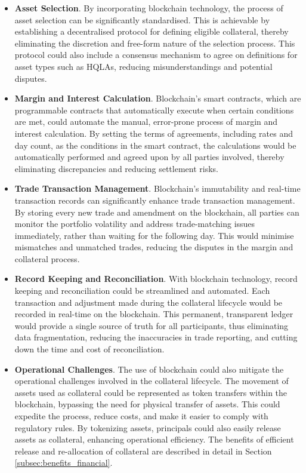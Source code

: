 \begin{itemize}
    \item \textbf{Asset Selection}. By incorporating blockchain technology, the process of asset selection can be significantly standardised. This is achievable by establishing a decentralised protocol for defining eligible collateral, thereby eliminating the discretion and free-form nature of the selection process. This protocol could also include a consensus mechanism to agree on definitions for asset types such as HQLAs, reducing misunderstandings and potential disputes.

    \item \textbf{Margin and Interest Calculation}. Blockchain's smart contracts, which are programmable contracts that automatically execute when certain conditions are met, could automate the manual, error-prone process of margin and interest calculation. By setting the terms of agreements, including rates and day count, as the conditions in the smart contract, the calculations would be automatically performed and agreed upon by all parties involved, thereby eliminating discrepancies and reducing settlement risks.
    
    \item \textbf{Trade Transaction Management}. Blockchain's immutability and real-time transaction records can significantly enhance trade transaction management. By storing every new trade and amendment on the blockchain, all parties can monitor the portfolio volatility and address trade-matching issues immediately, rather than waiting for the following day. This would minimise mismatches and unmatched trades, reducing the disputes in the margin and collateral process.
    
    \item \textbf{Record Keeping and Reconciliation}. With blockchain technology, record keeping and reconciliation could be streamlined and automated. Each transaction and adjustment made during the collateral lifecycle would be recorded in real-time on the blockchain. This permanent, transparent ledger would provide a single source of truth for all participants, thus eliminating data fragmentation, reducing the inaccuracies in trade reporting, and cutting down the time and cost of reconciliation.
    
    \item \textbf{Operational Challenges}. The use of blockchain could also mitigate the operational challenges involved in the collateral lifecycle. The movement of assets used as collateral could be represented as token transfers within the blockchain, bypassing the need for physical transfer of assets. This could expedite the process, reduce costs, and make it easier to comply with regulatory rules. By tokenizing assets, principals could also easily release assets as collateral, enhancing operational efficiency. The benefits of efficient release and re-allocation of collateral are described in detail in Section \ref{subsec:benefits_financial}.
\end{itemize}
